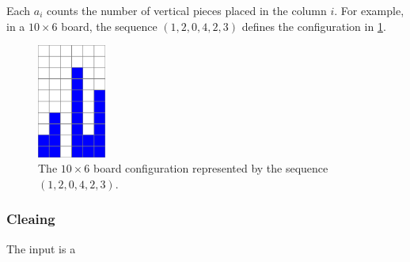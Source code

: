 Each $a_i$ counts the number of vertical pieces placed in the column $i$. For example, in a $10 \times 6 $  board, the sequence $(1,2,0,4,2,3)$ defines the configuration in 
\ref{dom:vconf}.

\begin{figure}[h]\label{dom:vconf} 
    \centering
    \includegraphics[width=0.2\textwidth]{./pictures/dominoes/vertical_configuration.pdf}
    \caption{The $10 \times 6 $ board configuration represented by the sequence $(1,2,0,4,2,3)$.}
\end{figure}

\subsubsection{Cleaing}

The input is a 
